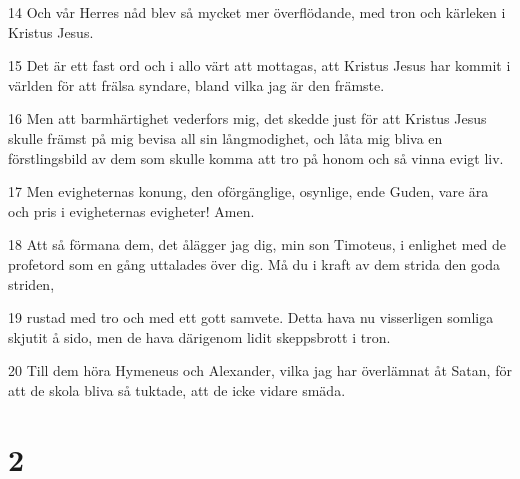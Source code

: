 \par 14 Och vår Herres nåd blev så mycket mer överflödande, med tron och kärleken i Kristus Jesus.
\par 15 Det är ett fast ord och i allo värt att mottagas, att Kristus Jesus har kommit i världen för att frälsa syndare, bland vilka jag är den främste.
\par 16 Men att barmhärtighet vederfors mig, det skedde just för att Kristus Jesus skulle främst på mig bevisa all sin långmodighet, och låta mig bliva en förstlingsbild av dem som skulle komma att tro på honom och så vinna evigt liv.
\par 17 Men evigheternas konung, den oförgänglige, osynlige, ende Guden, vare ära och pris i evigheternas evigheter! Amen.
\par 18 Att så förmana dem, det ålägger jag dig, min son Timoteus, i enlighet med de profetord som en gång uttalades över dig. Må du i kraft av dem strida den goda striden,
\par 19 rustad med tro och med ett gott samvete. Detta hava nu visserligen somliga skjutit å sido, men de hava därigenom lidit skeppsbrott i tron.
\par 20 Till dem höra Hymeneus och Alexander, vilka jag har överlämnat åt Satan, för att de skola bliva så tuktade, att de icke vidare smäda.

\chapter{2}

